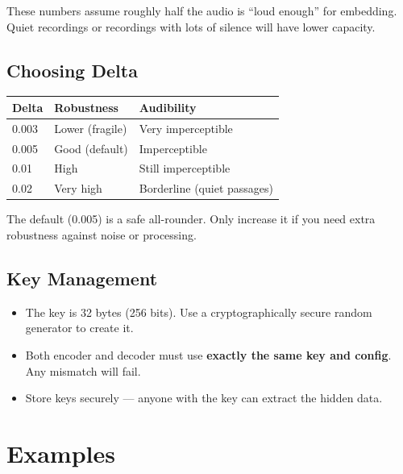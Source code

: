 \documentclass[11pt,a4paper]{article}
\begin{document}
\begin{warnbox}
These numbers assume roughly half the audio is ``loud enough'' for
embedding.  Quiet recordings or recordings with lots of silence
will have lower capacity.
\end{warnbox}

\subsection{Choosing Delta}

\begin{center}
\begin{tabular}{@{}lll@{}}
\toprule
Delta & Robustness & Audibility \\
\midrule
0.003 & Lower (fragile) & Very imperceptible \\
0.005 & Good (default) & Imperceptible \\
0.01  & High & Still imperceptible \\
0.02  & Very high & Borderline (quiet passages) \\
\bottomrule
\end{tabular}
\end{center}

The default (0.005) is a safe all-rounder.  Only increase it if you
need extra robustness against noise or processing.

\subsection{Key Management}

\begin{itemize}
    \item The key is 32 bytes (256 bits).  Use a cryptographically
          secure random generator to create it.
    \item Both encoder and decoder must use \textbf{exactly the same
          key and config}.  Any mismatch will fail.
    \item Store keys securely --- anyone with the key can extract
          the hidden data.
\end{itemize}


\section{Examples}
\end{document}
